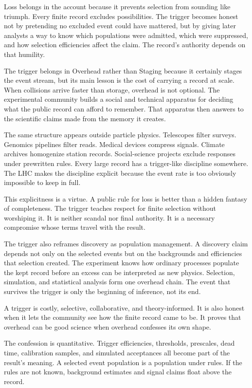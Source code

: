 Loss belongs in the account because it prevents selection from sounding
like triumph. Every finite record excludes possibilities. The trigger
becomes honest not by pretending no excluded event could have mattered,
but by giving later analysts a way to know which populations were
admitted, which were suppressed, and how selection efficiencies affect
the claim. The record's authority depends on that humility.

The trigger belongs in Overhead rather than Staging because it certainly
stages the event stream, but its main lesson is the cost of carrying a
record at scale. When collisions arrive faster than storage, overhead is
not optional. The experimental community builds a social and technical
apparatus for deciding what the public record can afford to remember.
That apparatus then answers to the scientific claims made from the memory
it creates.

The same structure appears outside particle physics. Telescopes filter
surveys. Genomics pipelines filter reads. Medical devices compress signals.
Climate archives homogenize station records. Social-science projects exclude
responses under prewritten rules. Every large record has a trigger-like
discipline somewhere. The LHC makes the discipline explicit because the event
rate is too obviously impossible to keep in full.

This explicitness is a virtue. A public rule for loss is better than a
hidden fantasy of completeness. The trigger teaches respect for finite
selection without worshiping it. It is neither scandal nor final
authority. It is a necessary compromise whose terms travel with the
result.

The trigger also reframes discovery as population management. A discovery
claim depends not only on the selected events but on the backgrounds and
efficiencies that selection created. The experiment knows how ordinary
processes populate the kept record before an excess can be interpreted as
new physics. Selection, simulation, and statistical analysis form one
overhead chain. The event that survives the trigger is only the beginning
of inference, not its end.

A trigger is costly, selective, collaborative, and theory-informed. It is
also honest when it lets the community see how the finite record came to
be. It proves that overhead can be good science when overhead confesses
its own shape.

The confession is quantitative. Trigger efficiencies, thresholds,
prescales, dead time, calibration samples, and simulated acceptances all
become part of the result's meaning. A selected event population is a
population under rules. If the rules are not known, background estimates
and signal claims float above the record.

